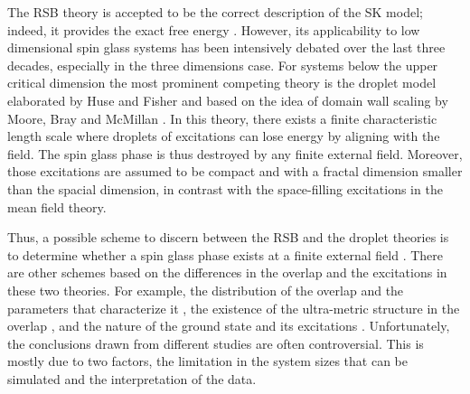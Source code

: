 \documentclass[aps,prb,twocolumn,showpacs,superscriptaddress]{revtex4}
\begin{document}
The RSB theory is accepted to be the correct description of the SK model; indeed, 
it provides the exact free energy \cite{Talagrand-2006,Guerra-2003}. 
However, its applicability to low dimensional spin glass systems has been intensively debated 
over the last three decades, especially in the three dimensions case. For systems 
below the upper critical dimension \cite{Harris-Lubensky-Chen-1976,Tasaki-1989,Green-Moore-Bray-1983} 
the most prominent competing theory is the droplet model elaborated by 
Huse and Fisher \cite{Fisher-Huse-1988,Fisher-Huse-1987} and based on the idea of 
domain wall scaling by Moore, Bray and McMillan \cite{McMillan-1984,Bray-Moore-1987}. 
In this theory, there exists a finite characteristic length scale where droplets of 
excitations can lose energy by aligning with the field. The spin glass phase is thus 
destroyed by any finite external field. Moreover, those excitations are assumed to 
be compact and with a fractal dimension smaller than the spacial dimension, in contrast 
with the space-filling excitations in the mean field theory. 

Thus, a possible scheme to discern between the RSB and the droplet theories is to determine
whether a spin glass phase exists at a finite external field \cite{Young-Katzgraber2004}. 
There are other schemes based on the differences in the overlap and the excitations in these two theories. 
For example, the distribution of the overlap and the parameters that characterize it \cite{Hatano-Gubernatis-2002, 
Marinari-etal-1998,Marinari-etal-1999,Bokil-etal-1999,Moore-etal-1998,Monthus-Garel-2013}, 
the existence of the ultra-metric structure in the overlap \cite{Hed-Young-Domany-2004,Contucci-etal-2007}, 
and the nature of the ground state and its 
excitations \cite{Palassini-Young-2000a,Palassini-Young-2000b,Aspelmeier-Moore-Young-2003,Marinari-Parisi-2001,
Houdayer-Martin-1999,Marinari-Parisi-Zuliani-2000,Marinari-etal-1999}.
Unfortunately, the conclusions drawn from different studies are often controversial.  
This is mostly due to two factors, the limitation in the system sizes that can be 
simulated and the interpretation of the data. 
\end{document}
